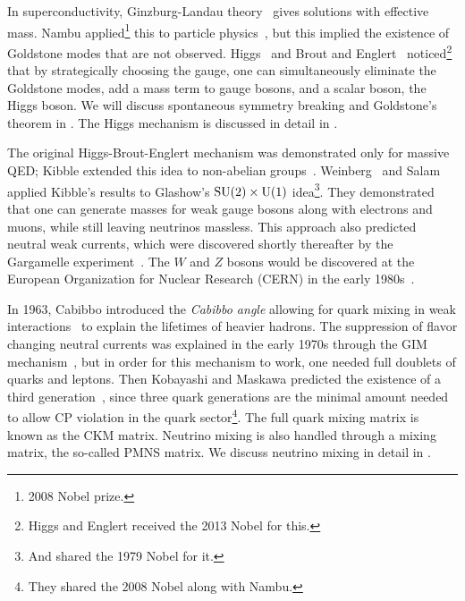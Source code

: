 In superconductivity, Ginzburg-Landau theory~\cite{ginzburg_theory_1950}
gives solutions with effective mass. Nambu applied\footnote{2008 Nobel prize.} 
this to particle
physics~\cite{nambu_axial_1960,nambu_dynamical_1961,nambu_dynamical_1961-1},
but this implied the existence of Goldstone modes that are not observed.
Higgs~\cite{higgs_broken_1964} and Brout and Englert~\cite{englert_broken_1964}
noticed\footnote{Higgs and Englert received the 2013 Nobel for this.} 
that by strategically choosing 
the gauge, one can simultaneously
eliminate the Goldstone modes, add a mass term to gauge bosons, and a scalar
boson, the Higgs boson.
We will discuss spontaneous symmetry breaking and Goldstone's theorem
 in . The Higgs
mechanism is discussed in detail in .


The original Higgs-Brout-Englert mechanism was demonstrated only for massive
QED; Kibble extended this idea to non-abelian
groups~\cite{kibble_symmetry_1967}. Weinberg~\cite{weinberg_model_1967}
and Salam~\cite{salam_weak_1968} applied Kibble's results to Glashow's
$\operatorname{SU}(2)\times\operatorname{U}(1)$ idea\footnote{And shared the 1979 Nobel for it.}. 
They demonstrated that one can generate masses
for weak gauge bosons along with electrons and muons, while still leaving
neutrinos massless. This approach also predicted neutral weak currents,
which were discovered shortly thereafter by the Gargamelle
experiment~\cite{hasert_observation_1974}. The $W$ and $Z$ bosons would
be discovered at the European Organization for Nuclear Research (CERN)
in the early 1980s~\cite{aubert_ratio_1983,arnison_experimental_1983}.


In 1963, Cabibbo introduced the {\it Cabibbo angle} allowing
for quark mixing in weak interactions~\cite{cabibbo_unitary_1963} to
explain the lifetimes of heavier hadrons. The suppression of flavor changing
neutral currents was explained in the early 1970s through the GIM
mechanism~\cite{glashow_weak_1970}, but in order for this mechanism to work,
one needed full doublets of quarks and leptons.
Then Kobayashi and Maskawa predicted the existence of a third
generation~\cite{kobayashi_cp_1973}, since three quark generations are the
minimal amount needed to allow CP violation in the quark sector\footnote{They
shared the 2008 Nobel along with Nambu.}. The full quark mixing matrix
is known as the CKM matrix. Neutrino mixing is also handled
through a mixing matrix, the so-called PMNS matrix. 
We discuss neutrino mixing in detail
in .


